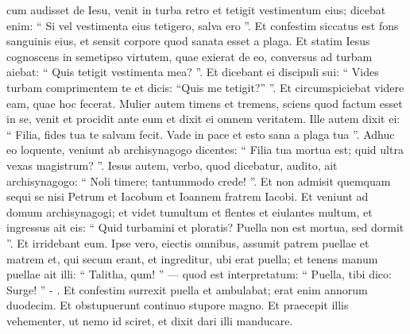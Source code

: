 \begin{biblechapter}
\begin{biblechapter}
\begin{biblechapter}
\begin{biblechapter}
\begin{biblechapter}
\verse cum audisset de Iesu, venit in turba retro et tetigit vestimentum eius; 
\verse dicebat enim: “ Si vel vestimenta eius tetigero, salva ero ”. 
\verse Et confestim siccatus est fons sanguinis eius, et sensit corpore quod sanata esset a plaga. 
\verse Et statim Iesus cognoscens in semetipso virtutem, quae exierat de eo, conversus ad turbam aiebat: “ Quis tetigit vestimenta mea? ”. 
\verse Et dicebant ei discipuli sui: “ Vides turbam comprimentem te et dicis: “Quis me tetigit?” ”. 
\verse Et circumspiciebat videre eam, quae hoc fecerat. 
\verse Mulier autem timens et tremens, sciens quod factum esset in se, venit et procidit ante eum et dixit ei omnem veritatem. 
\verse Ille autem dixit ei: “ Filia, fides tua te salvam fecit. Vade in pace et esto sana a plaga tua ”.
 \verse Adhuc eo loquente, veniunt ab archisynagogo dicentes: “ Filia tua mortua est; quid ultra vexas magistrum? ”. 
\verse Iesus autem, verbo, quod dicebatur, audito, ait archisynagogo: “ Noli timere; tantummodo crede! ”. 
\verse Et non admisit quemquam sequi se nisi Petrum et Iacobum et Ioannem fratrem Iacobi. 
 \verse Et veniunt ad domum archisynagogi; et videt tumultum et flentes et eiulantes multum, 
\verse et ingressus ait eis: “ Quid turbamini et ploratis? Puella non est mortua, sed dormit ”. 
\verse Et irridebant eum. Ipse vero, eiectis omnibus, assumit patrem puellae et matrem et, qui secum erant, et ingreditur, ubi erat puella; 
\verse et tenens manum puellae ait illi: “ Talitha, qum! ” — quod est interpretatum: “ Puella, tibi dico: Surge! ” - . 
\verse Et confestim surrexit puella et ambulabat; erat enim annorum duodecim. Et obstupuerunt continuo stupore magno. 
\verse Et praecepit illis vehementer, ut nemo id sciret, et dixit dari illi manducare.
 

\end{biblechapter}
\end{biblechapter}
\end{biblechapter}
\end{biblechapter}
\end{biblechapter}
